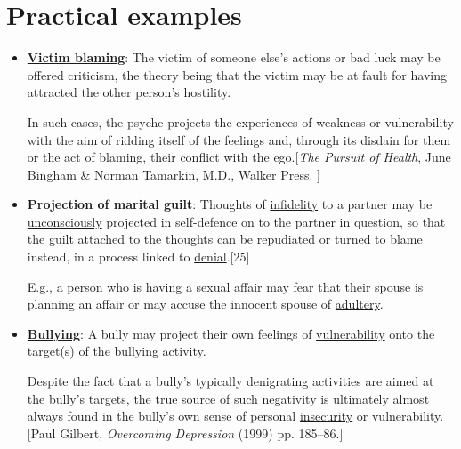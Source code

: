 \documentclass{book}
\numberwithin{equation}{section}
\begin{document}
\section{Practical examples}
\begin{itemize}
    \item \href{https://en.wikipedia.org/wiki/Victim_blaming}{\textbf{Victim blaming}}: The victim of someone else's actions or bad luck may be offered criticism, the theory being that the victim may be at fault for having attracted the other person's hostility.
    
    In such cases, the psyche projects the experiences of weakness or vulnerability with the aim of ridding itself of the feelings and, through its disdain for them or the act of blaming, their conflict with the ego.[\textit{The Pursuit of Health}, June Bingham \& Norman Tamarkin, M.D., Walker Press. ]
    \item \textbf{Projection of marital guilt}: Thoughts of \href{https://en.wikipedia.org/wiki/Infidelity}{infidelity} to a partner may be \href{https://en.wikipedia.org/wiki/Unconscious_mind}{unconsciously} projected in self-defence on to the partner in question, so that the \href{https://en.wikipedia.org/wiki/Guilt_(emotion)}{guilt} attached to the thoughts can be repudiated or turned to \href{https://en.wikipedia.org/wiki/Blame}{blame} instead, in a process linked to \href{https://en.wikipedia.org/wiki/Denial}{denial}.[25]
    
    E.g., a person who is having a sexual affair may fear that their spouse is planning an affair or may accuse the innocent spouse of \href{https://en.wikipedia.org/wiki/Adultery}{adultery}.
    \item \href{https://en.wikipedia.org/wiki/Bullying}{\textbf{Bullying}}: A bully may project their own feelings of \href{https://en.wikipedia.org/wiki/Vulnerability}{vulnerability} onto the target(s) of the bullying activity.
    
    Despite the fact that a bully's typically denigrating activities are aimed at the bully's targets, the true source of such negativity is ultimately almost always found in the bully's own sense of personal \href{https://en.wikipedia.org/wiki/Emotional_security}{insecurity} or vulnerability.[Paul Gilbert, \textit{Overcoming Depression} (1999) pp. 185--86.]
    

\end{itemize}
\end{document}
